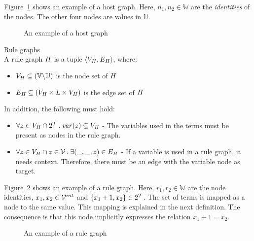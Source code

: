 Figure~\ref{fig:hostgraph_example} shows an example of a host graph. Here, $n_1, n_2 \in \mathbb{W}$ are the \textit{identities} of the nodes. The other four nodes are values in $\mathbb{U}$.

\begin{figure}[ht]
  \begin{center}
    
  \end{center}
  \caption{An example of a host graph}
  \label{fig:hostgraph_example}
\end{figure}

\vspace{10px}
\begin{definition} Rule graphs \\
A rule graph $H$ is a tuple $\langle V_{H}, E_{H} \rangle$, where:
\begin{itemize}
  \item $V_{H} \subseteq (\mathbb{V} \backslash \mathbb{U})$ is the node set of $H$
  \item $E_{H} \subseteq (V_{H} \times L \times V_{H})$ is the edge set of $H$
\end{itemize}
In addition, the following must hold:
\begin{itemize}
\item $\forall z \in V_{H} \cap 2^{\mathcal{T}}\: .\:\mathit{var}(z) \subseteq V_{H}$ - The variables used in the terms must be present as nodes in the rule graph.
\item $\forall z \in V_{H} \cap z \in \mathcal{V}\: .\: \exists (\_, \_, z) \in E_{H}$ - If a variable is used in a rule graph, it needs context. Therefore, there must be an edge with the variable node as target.
\end{itemize}
\end{definition}
\vspace{10px}

Figure~\ref{fig:rulegraph_example} shows an example of a rule graph. Here, $r_1, r_2 \in \mathbb{W}$ are the node identities, $x_1,x_2 \in \mathcal{V}^{int}$ and $\{x_1+1, x_2\} \in 2^{\mathcal{T}}$. The set of terms is mapped as a node to the same value. This mapping is explained in the next definition. The consequence is that this node implicitly expresses the relation $x_1+1 = x_2$.

\begin{figure}[ht]
  \begin{center}
    
  \end{center}
  \caption{An example of a rule graph}
  \label{fig:rulegraph_example}
\end{figure}

